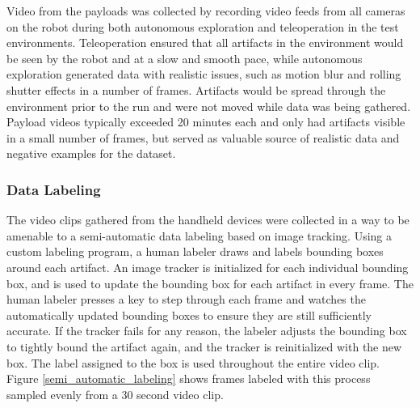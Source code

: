 Video from the payloads was collected by recording video feeds from all cameras on the robot during both autonomous exploration and teleoperation in the test environments. Teleoperation ensured that all artifacts in the environment would be seen by the robot and at a slow and smooth pace, while autonomous exploration generated data with realistic issues, such as motion blur and rolling shutter effects in a number of frames. Artifacts would be spread through the environment prior to the run and were not moved while data was being gathered. Payload videos typically exceeded 20 minutes each and only had artifacts visible in a small number of frames, but served as valuable source of realistic data and negative examples for the dataset.

\subsubsection{Data Labeling}

The video clips gathered from the handheld devices were collected in a way to be amenable to a semi-automatic data labeling based on image tracking. Using a custom labeling program, a human labeler draws and labels bounding boxes around each artifact. An image tracker is initialized for each individual bounding box, and is used to update the bounding box for each artifact in every frame. The human labeler presses a key to step through each frame and watches the automatically updated bounding boxes to ensure they are still sufficiently accurate. If the tracker fails for any reason, the labeler adjusts the bounding box to tightly bound the artifact again, and the tracker is reinitialized with the new box. The label assigned to the box is used throughout the entire video clip. Figure \ref{semi_automatic_labeling} shows frames labeled with this process sampled evenly from a 30 second video clip.


